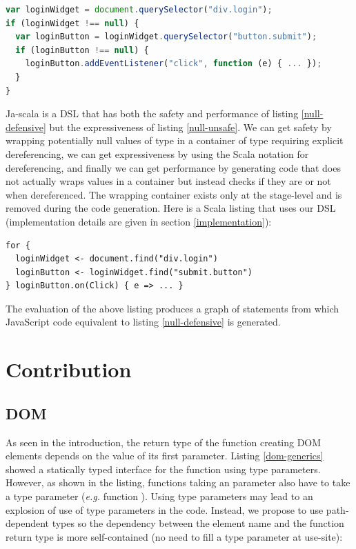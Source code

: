 \documentclass[runningheads,a4paper]{llncs}
\newcommand{\eg}{\emph{e.g.}}
\begin{document}
\begin{lstlisting}[language=JavaScript,label=null-defensive,caption=Defensive programming to handle null references]
var loginWidget = document.querySelector("div.login");
if (loginWidget !== null) {
  var loginButton = loginWidget.querySelector("button.submit");
  if (loginButton !== null) {
    loginButton.addEventListener("click", function (e) { ... });
  }
}
\end{lstlisting}

Ja-scala is a DSL that has both the safety and performance of listing \ref{null-defensive} but the
expressiveness of listing \ref{null-unsafe}. We can get safety by wrapping potentially null values of type
 in a container of type  requiring explicit dereferencing, we can get
expressiveness by using the Scala  notation for dereferencing, and finally we can get performance by
generating code that does not actually wraps values in a container but instead checks if they are  or not
when dereferenced. The wrapping container exists only at the stage-level and is removed during the code generation.
Here is a Scala listing that uses our DSL (implementation details are given in section \ref{implementation}):

\begin{lstlisting}
for {
  loginWidget <- document.find("div.login")
  loginButton <- loginWidget.find("submit.button")
} loginButton.on(Click) { e => ... }
\end{lstlisting}

The evaluation of the above listing produces a graph of statements from which JavaScript code equivalent to
listing \ref{null-defensive} is generated.

\section{Contribution}

\subsection{DOM}

As seen in the introduction, the return type of the function creating DOM elements depends on
the value of its first parameter. Listing \ref{dom-generics} showed a statically typed interface
for the  function using type parameters. However, as shown in the listing,
functions taking an  parameter also have to take a type parameter (\eg{} function
). Using type parameters may lead to an explosion of use of type parameters in
the code. Instead, we propose to use path-dependent types so the dependency between the
element name and the function return type is more self-contained (no need to fill a type parameter
at use-site):
\end{document}
